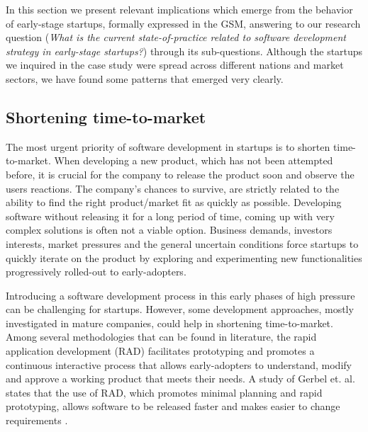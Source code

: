 \documentclass[10pt,journal,letterpaper,compsoc]{IEEEtran}
\begin{document}
In this section we present relevant implications which emerge from the behavior
of early-stage startups, formally expressed in the GSM, answering to our
research question (\textit{What is the current state-of-practice related to
software development strategy in early-stage startups?}) through its 
sub-questions. Although the startups we inquired in the case study were spread
across different nations and market sectors, we have found some patterns
that emerged very clearly.

\subsection{Shortening time-to-market}

The most urgent priority of software development in startups is to shorten
time-to-market. When developing a new product, which has not been attempted
before, it is crucial for the company to release the product soon and observe
the users reactions. The company's chances to survive, are strictly related to
the ability to find the right product/market fit as quickly as possible.
Developing software without releasing it for a long period of time, coming up
with very complex solutions is often not a viable option. Business demands,
investors interests, market pressures and the general uncertain conditions force
startups to quickly iterate on the product by exploring and experimenting new
functionalities progressively rolled-out to early-adopters. 

Introducing a software development process in this early phases of high pressure can be challenging for startups. However, some development approaches, mostly investigated in mature companies, could help in shortening time-to-market. Among several methodologies that can be found in literature, the rapid application development (RAD) \cite{mcconnell2004professional} facilitates prototyping and promotes a continuous interactive process that allows early-adopters to understand, modify and approve a working product that meets their needs. A study of Gerbel et. al. states that the use of RAD, which promotes minimal planning and rapid prototyping, allows software to be released faster and makes easier to change requirements \cite{Gerber_practicalimplications}. 

\end{document}
